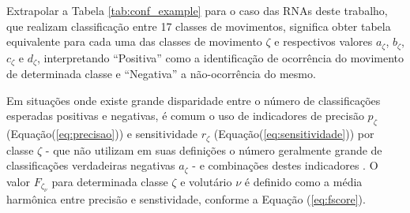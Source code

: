 \begin{table}[htb]
\end{table}

Extrapolar a Tabela \ref{tab:conf_example} para o caso das RNAs deste trabalho, que realizam classificação entre 17 classes de movimentos, significa obter tabela equivalente para cada uma das classes de movimento $\zeta$ e respectivos valores $a_\zeta$, $b_\zeta$, $c_\zeta$ e $d_\zeta$, interpretando ``Positiva'' como a identificação de ocorrência do movimento de determinada classe e ``Negativa'' a não-ocorrência do mesmo. 



Em situações onde existe grande disparidade entre o número de classificações esperadas positivas e negativas, é comum o uso de indicadores de precisão $p_\zeta$ (Equação(\ref{eq:precisao})) e sensitividade $r_\zeta$ (Equação(\ref{eq:sensitividade})) por classe $\zeta$ - que não utilizam em suas definições o número geralmente grande de classificações verdadeiras negativas $a_\zeta$ - e combinações destes indicadores \cite{Kubat1998}. O valor $F_{\zeta_{\nu}}$ para determinada classe $\zeta$ e volutário $\nu$ é definido como a média harmônica entre precisão e senstividade, conforme a Equação (\ref{eq:fscore}).

